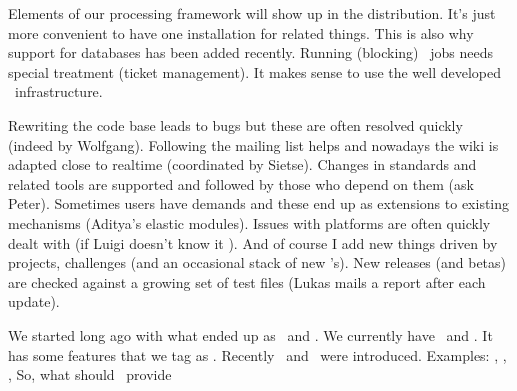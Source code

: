         \startitem Elements of our processing framework will show up in the distribution. \stopitem \FlushStep
        \startitem It's just more convenient to have one installation for related things. \stopitem \FlushStep
        \startitem This is also why support for databases has been added recently. \stopitem \FlushStep
        \startitem Running (blocking) \TEX\ jobs needs special treatment (ticket management). \stopitem \FlushStep
        \startitem It makes sense to use the well developed \TDS\ infrastructure. \stopitem \FlushStep

    \stopitemize

\stopsubject

\StopSteps

\page

\StartSteps

\startsubject[title=Keep an eye on updates]

    \startitemize[packed]

        \startitem Rewriting the code base leads to bugs but these are often resolved quickly
                   (indeed by Wolfgang). \stopitem \FlushStep
        \startitem Following the mailing list helps and nowadays the wiki is adapted close to
                   realtime (coordinated by Sietse). \stopitem \FlushStep
        \startitem Changes in standards and related tools are supported and followed by those who
                   depend on them (ask Peter). \stopitem \FlushStep
        \startitem Sometimes users have demands and these end up as extensions to existing
                   mechanisms (Aditya's elastic modules). \stopitem \FlushStep
        \startitem Issues with platforms are often quickly dealt with (if Luigi doesn't know it
                   \unknown). \stopitem \FlushStep
        \startitem And of course I add new things driven by projects, challenges (and an occasional
                   stack of new \CD's). \stopitem \FlushStep
        \startitem New releases (and betas) are checked against a growing set of test files (Lukas
                   mails a report after each update). \stopitem \FlushStep
    \stopitemize

\stopsubject

\StopSteps

\page

\StartSteps

\startsubject[title=Just ask]

    \startitemize[packed]

        \startitem We started long ago with what ended up as \MKII\ and \MPII. \stopitem \FlushStep
        \startitem We currently have \MKIV\ and \MPIV. \stopitem \FlushStep
        \startitem It has some features that we tag as \MKVI. \stopitem \FlushStep
        \startitem Recently \MKIX\ and \MKXI\ were introduced. \stopitem \FlushStep
        \blank
        \startitem Examples: \MKIV, \MKVI, \MKIX, \MKXI \stopitem \FlushStep
        \blank
        \startitem So, what should \MKIC\ provide \stopitem \FlushStep

